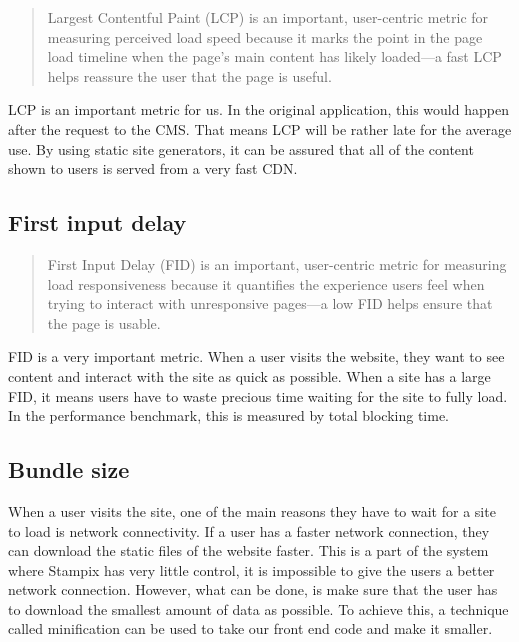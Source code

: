 \begin{quote}
	Largest Contentful Paint (LCP) is an important, user-centric metric for measuring perceived load speed because it marks the point in the page load timeline when the page's main content has likely loaded—a fast LCP helps reassure the user that the page is useful.
	\hfill \cite{webvitalswebsite}
\end{quote}

LCP is an important metric for us. In the original application, this would happen after the request to the CMS. 
That means LCP will be rather late for the average use.
By using static site generators, it can be assured that all of the content shown to users is served from a very fast CDN. 

\subsection{First input delay}

\begin{quote}
	First Input Delay (FID) is an important, user-centric metric for measuring load responsiveness because it quantifies the experience users feel when trying to interact with unresponsive pages—a low FID helps ensure that the page is usable.
	\hfill \cite{webvitalswebsite}
\end{quote}

FID is a very important metric. When a user visits the website, they want to see content and interact with the site as quick as possible. 
When a site has a large FID, it means users have to waste precious time waiting for the site to fully load. In the performance benchmark, this is measured by total blocking time. 

\subsection{Bundle size}

When a user visits the site, one of the main reasons they have to wait for a site to load is network connectivity. 
If a user has a faster network connection, they can download the static files of the website faster.
This is a part of the system where Stampix has very little control, it is impossible to give the users a better network connection. 
However, what can be done, is make sure that the user has to download the smallest amount of data as possible. 
To achieve this, a technique called minification can be used to take our front end code and make it smaller.

